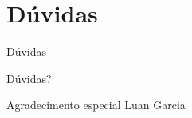 \section{Dúvidas}
\begin{frame}{Dúvidas}
	\begin{center}
		{\Huge Dúvidas?}
	\end{center}
	\begin{flushright}
		{\tiny Agradecimento especial Luan Garcia}
	\end{flushright}
\end{frame}

